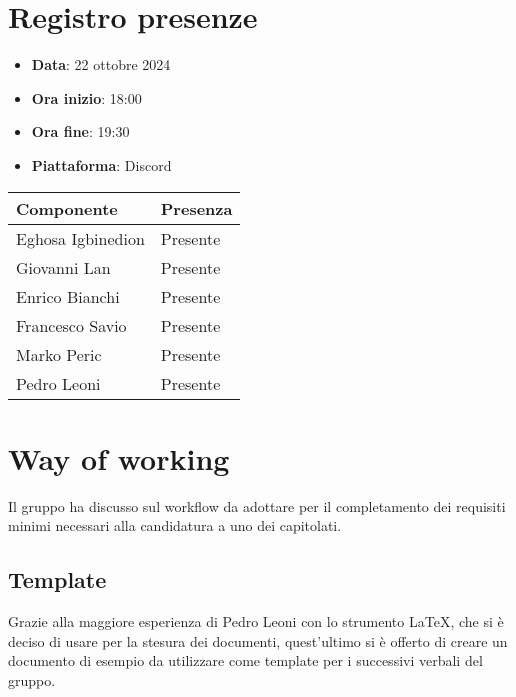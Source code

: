 \documentclass[a4paper, 12pt]{article}
\begin{document}
\section{Registro presenze}
   \begin{itemize}
        \item[] \textbf{Data}: 22 ottobre 2024
        \item[] \textbf{Ora inizio}: 18:00
        \item[] \textbf{Ora fine}: 19:30
        \item[] \textbf{Piattaforma}: Discord	
    \end{itemize}
\begin{table}[!h]
    \centering
    {\renewcommand{\arraystretch}{2}
    \begin{tabularx}{\textwidth}{| X | X |}
        \hline
            \textbf{\large Componente} & 
            \textbf{\large Presenza} \\ 
        \hline 
            Eghosa Igbinedion &
            Presente \\ 
        \hline 
            Giovanni Lan &
            Presente \\ 
        \hline 
            Enrico Bianchi &
            Presente \\ 
        \hline 
            Francesco Savio &
            Presente \\ 
        \hline 
            Marko Peric &
            Presente \\ 
        \hline 
            Pedro Leoni &
            Presente \\ 
        \hline 
    \end{tabularx}}
\end{table}

\newpage

\section{Way of working}
Il gruppo ha discusso sul workflow da adottare per il completamento dei requisiti minimi necessari alla candidatura a uno dei capitolati.

\subsection{Template}
Grazie alla maggiore esperienza di Pedro Leoni con lo strumento LaTeX, che si è deciso di usare per la stesura dei documenti, quest'ultimo si è offerto di creare un documento di esempio da utilizzare come template per i successivi verbali del gruppo.
\end{document}
